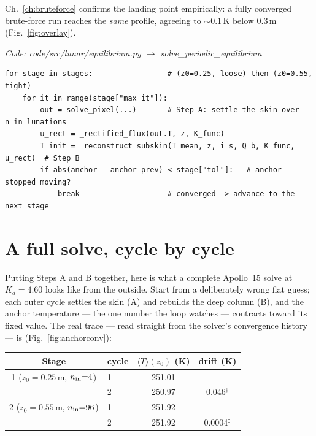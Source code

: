 \documentclass[11pt]{report}
\newcommand{\Tm}{\langle T\rangle}
\newcommand{\code}[1]{{\ttfamily\small #1}}
\begin{document}
\noindent Ch.~\ref{ch:bruteforce} confirms the landing point empirically: a fully
converged brute-force run reaches the \emph{same} profile, agreeing to
${\sim}0.1$\,K below $0.3$\,m (Fig.~\ref{fig:overlay}).

{\small\color{dim}\textit{Code: \code{code/src/lunar/equilibrium.py} $\to$ \code{solve\_periodic\_equilibrium}}}
\begin{lstlisting}[style=py]
for stage in stages:                 # (z0=0.25, loose) then (z0=0.55, tight)
    for it in range(stage["max_it"]):
        out = solve_pixel(...)       # Step A: settle the skin over n_in lunations
        u_rect = _rectified_flux(out.T, z, K_func)
        T_init = _reconstruct_subskin(T_mean, z, i_s, Q_b, K_func, u_rect)  # Step B
        if abs(anchor - anchor_prev) < stage["tol"]:   # anchor stopped moving?
            break                    # converged -> advance to the next stage
\end{lstlisting}

\section{A full solve, cycle by cycle}\label{sec:fullsolve}

Putting Steps A and B together, here is what a complete Apollo~15 solve at
$K_d=4.60$ looks like from the outside. Start from a deliberately wrong flat
guess; each outer cycle settles the skin (A) and rebuilds the deep column (B),
and the anchor temperature --- the one number the loop watches --- contracts
toward its fixed value. The real trace --- read straight from the solver's
convergence history --- is (Fig.~\ref{fig:anchorconv}):

\begin{center}\small
\begin{tabular}{@{}clcc@{}}
\toprule
Stage & cycle & $\Tm(z_0)$ (K) & drift (K) \\
\midrule
1 ($z_0{=}0.25$\,m, $n_{\rm in}{=}4$)  & 1 & 251.01 & --- \\
                                       & 2 & 250.97 & 0.046$^{\dagger}$ \\
\midrule
2 ($z_0{=}0.55$\,m, $n_{\rm in}{=}96$) & 1 & 251.92 & --- \\
                                       & 2 & 251.92 & 0.0004$^{\ddagger}$ \\
\bottomrule
\end{tabular}
\end{center}
\end{document}
